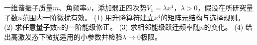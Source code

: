 一维谐振子质量\(m\)、角频率\(\omega\)，添加弱正四次势\(V_1=\lambda x^4\)，\(\lambda>0\)，假设在所研究量子数\(n\)范围内一阶微扰有效。
(1) 用升降算符建立\(x^4\)的矩阵元结构与选择规则。
(2) 求任意量子数\(n\)的一阶能级修正。
(3) 求相邻能级跃迁频率随\(n\)的变化。
(4) 给出高激发态下微扰适用的小参数并检验\(\lambda\to0\)极限。
